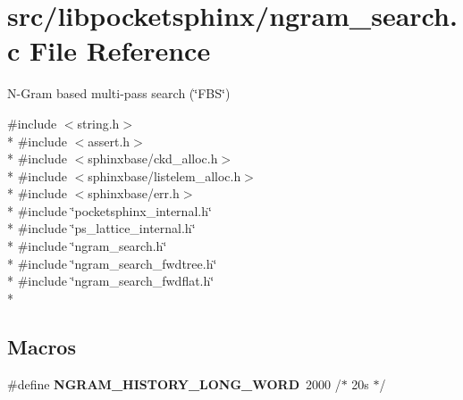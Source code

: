 \section{src/libpocketsphinx/ngram\-\_\-search.c File Reference}
\label{ngram__search_8c}


N-\/\-Gram based multi-\/pass search (\char`\"{}\-F\-B\-S\char`\"{})  


{\ttfamily \#include $<$string.\-h$>$}\\*
{\ttfamily \#include $<$assert.\-h$>$}\\*
{\ttfamily \#include $<$sphinxbase/ckd\-\_\-alloc.\-h$>$}\\*
{\ttfamily \#include $<$sphinxbase/listelem\-\_\-alloc.\-h$>$}\\*
{\ttfamily \#include $<$sphinxbase/err.\-h$>$}\\*
{\ttfamily \#include \char`\"{}pocketsphinx\-\_\-internal.\-h\char`\"{}}\\*
{\ttfamily \#include \char`\"{}ps\-\_\-lattice\-\_\-internal.\-h\char`\"{}}\\*
{\ttfamily \#include \char`\"{}ngram\-\_\-search.\-h\char`\"{}}\\*
{\ttfamily \#include \char`\"{}ngram\-\_\-search\-\_\-fwdtree.\-h\char`\"{}}\\*
{\ttfamily \#include \char`\"{}ngram\-\_\-search\-\_\-fwdflat.\-h\char`\"{}}\\*
\subsection*{Macros}
\begin{DoxyCompactItemize}
\item 
\#define {\bfseries N\-G\-R\-A\-M\-\_\-\-H\-I\-S\-T\-O\-R\-Y\-\_\-\-L\-O\-N\-G\-\_\-\-W\-O\-R\-D}~2000 /$\ast$ 20s $\ast$/\label{ngram__search_8c_af9ad6b3d4ef3ad501da8e2296b25a131}

\end{DoxyCompactItemize}
